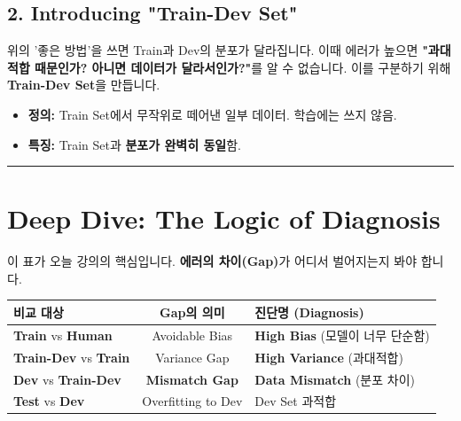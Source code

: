 \documentclass[11pt,a4paper]{book}
\theoremstyle{definition}
\begin{document}
\subsection{2. Introducing "Train-Dev Set"}
위의 '좋은 방법'을 쓰면 Train과 Dev의 분포가 달라집니다. 이때 에러가 높으면 \textbf{"과대적합 때문인가? 아니면 데이터가 달라서인가?"}를 알 수 없습니다.
이를 구분하기 위해 \textbf{Train-Dev Set}을 만듭니다.
\begin{itemize}
    \item \textbf{정의:} Train Set에서 무작위로 떼어낸 일부 데이터. 학습에는 쓰지 않음.
    \item \textbf{특징:} Train Set과 \textbf{분포가 완벽히 동일}함.
\end{itemize}

\vspace{0.5cm}\hrule\vspace{0.5cm}

\section{Deep Dive: The Logic of Diagnosis}

이 표가 오늘 강의의 핵심입니다. \textbf{에러의 차이(Gap)}가 어디서 벌어지는지 봐야 합니다.

\begin{diagnosisbox}[title={Mismatch 진단 로직}]
\begin{center}
\begin{tabular}{l|c|l}
\hline
\textbf{비교 대상} & \textbf{Gap의 의미} & \textbf{진단명 (Diagnosis)} \\ \hline
\textbf{Train} vs \textbf{Human} & Avoidable Bias & \textbf{High Bias} (모델이 너무 단순함) \\ \hline
\textbf{Train-Dev} vs \textbf{Train} & Variance Gap & \textbf{High Variance} (과대적합) \\ \hline
\textbf{Dev} vs \textbf{Train-Dev} & \textbf{Mismatch Gap} & \textbf{Data Mismatch} (분포 차이) \\ \hline
\textbf{Test} vs \textbf{Dev} & Overfitting to Dev & Dev Set 과적합 \\ \hline
\end{tabular}
\end{center}
\end{diagnosisbox}
\end{document}
